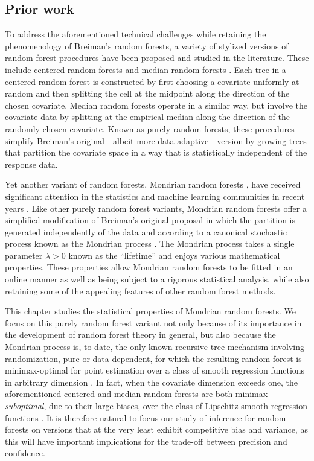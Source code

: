 \subsection{Prior work}

To address the aforementioned technical challenges while retaining the
phenomenology of Breiman's random forests, a variety of stylized versions of
random forest procedures have been proposed and studied in the literature.
These include centered random forests
\citep{biau2012analysis,arnould2023interpolation} and median random forests
\citep{duroux2016impact,arnould2023interpolation}. Each tree in a centered
random forest is constructed by first choosing a covariate uniformly at random
and then splitting the cell at the midpoint along the direction of the chosen
covariate. Median random forests operate in a similar way, but involve the
covariate data by splitting at the empirical median along the direction of the
randomly chosen covariate. Known as purely random forests, these procedures
simplify Breiman's original---albeit more data-adaptive---version by growing
trees that partition the covariate space in a way that is statistically
independent of the response data.

Yet another variant of random forests, Mondrian random forests
\citep{lakshminarayanan2014mondrian}, have received significant attention in
the statistics and machine learning communities in recent years
\citep{ma2020isolation, mourtada2020minimax, scillitoe2021uncertainty,
mourtada2021amf, vicuna2021reducing, gao2022towards, o2022stochastic}. Like
other purely random forest variants, Mondrian random forests offer a simplified
modification of Breiman's original proposal in which the partition is generated
independently of the data and according to a canonical stochastic process known
as the Mondrian process \citep{roy2008mondrian}. The Mondrian process takes a
single parameter $\lambda > 0$ known as the ``lifetime'' and enjoys various
mathematical properties. These properties allow Mondrian random forests to be
fitted in an online manner as well as being subject to a rigorous statistical
analysis, while also retaining some of the appealing features of other random
forest methods.

This chapter studies the statistical properties of Mondrian random forests. We
focus on this purely random forest variant not only because of its importance
in the development of random forest theory in general, but also because the
Mondrian process is, to date, the only known recursive tree mechanism involving
randomization, pure or data-dependent, for which the resulting random forest is
minimax-optimal for point estimation over a class of smooth regression
functions in arbitrary dimension \citep{mourtada2020minimax}. In fact, when the
covariate dimension exceeds one, the aforementioned centered and median random
forests are both minimax \emph{suboptimal}, due to their large biases, over the
class of Lipschitz smooth regression functions \citep{klusowski2021sharp}. It
is therefore natural to focus our study of inference for random forests on
versions that at the very least exhibit competitive bias and variance, as this
will have important implications for the trade-off between precision and
confidence.

